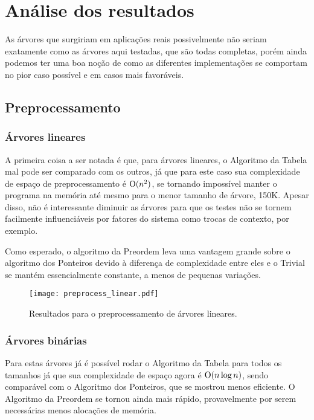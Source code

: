 \section{Análise dos resultados}
As árvores que surgiriam em aplicações reais possivelmente não seriam exatamente como
as árvores aqui testadas, que são todas completas, porém ainda podemos ter uma boa
noção de como as diferentes implementações se comportam no pior caso possível e em casos
mais favoráveis.

\subsection{Preprocessamento}

\subsubsection{Árvores lineares}
A primeira coisa a ser notada é que, para árvores lineares, o Algoritmo da Tabela mal
pode ser comparado com os outros, já que para este caso sua complexidade de espaço
de preprocessamento é $\mathrm{O}(n^2)$, se tornando impossível manter o programa na memória
até mesmo para o menor tamanho de árvore, 150K. Apesar disso, não é interessante
diminuir as árvores para que os testes não se tornem facilmente influenciáveis por
fatores do sistema como trocas de contexto, por exemplo.

Como esperado, o algoritmo da Preordem leva uma vantagem grande sobre o algoritmo dos
Ponteiros devido à diferença de complexidade entre eles e o Trivial se mantém
essencialmente constante, a menos de pequenas variações.

\begin{figure}
  \texttt{[image: preprocess\_linear.pdf]}
  \caption{Resultados para o preprocessamento de árvores lineares.}
\end{figure}

\newpage

\subsubsection{Árvores binárias}
Para estas árvores já é possível rodar o Algoritmo da Tabela para todos os tamanhos já
que sua complexidade de espaço agora é $\mathrm{O}(n \log n)$, sendo comparável com o
Algoritmo dos Ponteiros, que se mostrou menos eficiente. O Algoritmo da Preordem se tornou
ainda mais rápido, provavelmente por serem necessárias menos alocações de memória.

